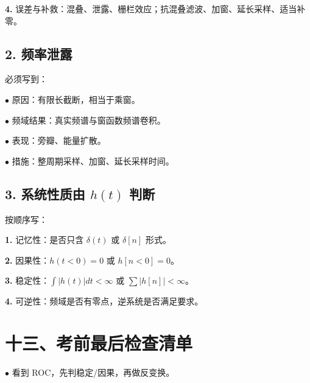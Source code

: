 \documentclass[11pt]{ctexart}
\begin{document}
\noindent\textbf{4.} 误差与补救：混叠、泄露、栅栏效应；抗混叠滤波、加窗、延长采样、适当补零。\par



\subsection*{2. 频率泄露}



必须写到：\par



\noindent\(\bullet\) 原因：有限长截断，相当于乘窗。\par

\noindent\(\bullet\) 频域结果：真实频谱与窗函数频谱卷积。\par

\noindent\(\bullet\) 表现：旁瓣、能量扩散。\par

\noindent\(\bullet\) 措施：整周期采样、加窗、延长采样时间。\par



\subsection*{3. 系统性质由 \(h(t)\) 判断}



按顺序写：\par



\noindent\textbf{1.} 记忆性：是否只含 \(\delta(t)\) 或 \(\delta[n]\) 形式。\par

\noindent\textbf{2.} 因果性：\(h(t<0)=0\) 或 \(h[n<0]=0\)。\par

\noindent\textbf{3.} 稳定性：\(\int |h(t)|dt<\infty\) 或 \(\sum |h[n]|<\infty\)。\par

\noindent\textbf{4.} 可逆性：频域是否有零点，逆系统是否满足要求。\par



\section*{十三、考前最后检查清单}



\noindent\(\bullet\) 看到 ROC，先判稳定/因果，再做反变换。\par
\end{document}
